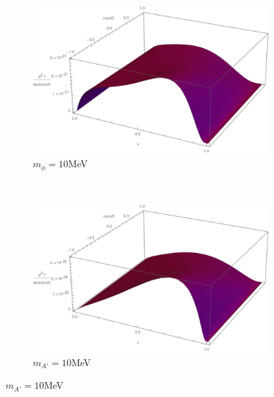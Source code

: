 \begin{figure}[H]
    \begin{subfigure}[b]{0.45\textwidth}
    \includegraphics[width=\textwidth]{imgs/S0-01}
    \caption{$m_\phi = 10$MeV}
    \end{subfigure}
    ~
    \begin{subfigure}[b]{0.45\textwidth}
    \includegraphics[width=\textwidth]{imgs/V0-01}
    \caption{$m_{A'} = 10$MeV}
    \end{subfigure}
    

\end{figure}
